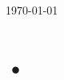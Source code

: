 \documentclass[12pt]{article}
\begin{document}
\begin{titlepage}


{\large \today}\\[2cm] %


\vfill %

\end{titlepage}
\setlength{\parindent}{0pt}
\tableofcontents
\newpage

\section{•}
\end{document}
